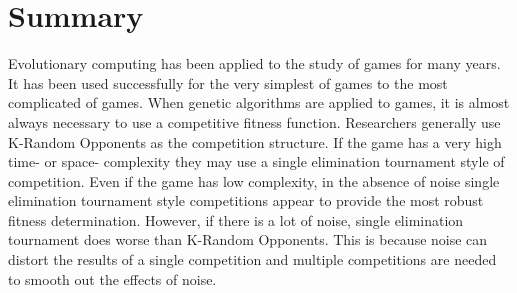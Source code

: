 \section{Summary}

Evolutionary computing has been applied to the study of games for many years. It
has been used successfully for the very simplest of games to the most
complicated of games. When genetic algorithms are applied to games, it is almost
always necessary to use a competitive fitness function. Researchers generally
use K-Random Opponents as the competition structure. If the game has a very high
time- or space- complexity they may use a single elimination tournament style of
competition. Even if the game has low complexity, in the absence of noise single
elimination tournament style competitions appear to provide the most robust
fitness determination. However, if there is a lot of noise, single elimination
tournament does worse than K-Random Opponents. This is because noise can distort
the results of a single competition and multiple competitions are needed to
smooth out the effects of noise.